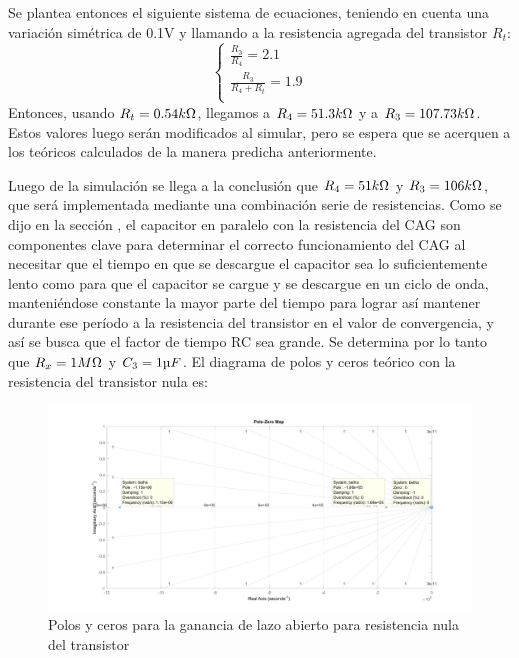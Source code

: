 \documentclass[../../tc_tp6_main.tex]{subfiles}
\begin{document}
Se plantea entonces el siguiente sistema de ecuaciones, teniendo en cuenta una variación simétrica de 0.1V y llamando a la resistencia agregada del transistor $R_t$:
	 \begin{equation}
  	   \left\{
	  	    \begin{array}{ll}
		 					\frac{R_3}{R_4} = 2.1     \\
			 				\frac{R_3}{R_4+R_t} = 1.9\\
	     	 \end{array}
	     	\right.
 	\end{equation}
 	Entonces, usando $R_t= 0.54k\ohm$,  llegamos a $R_4 = 51.3k\ohm$ y a $R_3 = 107.73k\ohm$. Estos valores luego serán modificados al simular, pero se espera que se acerquen a los teóricos calculados de la manera predicha anteriormente.\par 
Luego de la simulación se llega a la conclusión que $R_4 = 51k\ohm$ y $R_3 = 106k\ohm$, que será implementada mediante una combinación serie de resistencias.
Como se dijo en la sección , el capacitor en paralelo con la resistencia del CAG son componentes clave para determinar el correcto funcionamiento del CAG al necesitar que el tiempo en que se descargue el capacitor sea lo suficientemente lento como para que el capacitor se cargue y se descargue en un ciclo de onda, manteniéndose constante la mayor parte del tiempo para lograr así mantener durante ese período a la resistencia del transistor en el valor de convergencia, y así se busca que el factor de tiempo RC sea grande. Se determina por lo tanto que $R_x = 1M\ohm$ y $C_3 = 1\micro F$.
El diagrama de polos y ceros teórico con la resistencia del transistor nula es:\par

\begin{figure}[H]	
	\centering
	\includegraphics[scale=0.2]{imagenes/polos_ceros_betha.png}
	\caption{Polos y ceros para la ganancia de lazo abierto para resistencia nula del transistor}
	\label{fig:ej1_polos_ceros_betha}
\end{figure}
\end{document}
